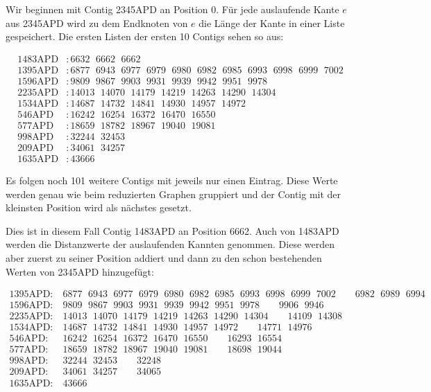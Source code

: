 Wir beginnen mit Contig 2345APD an Position 0. Für jede auslaufende Kante $e$ aus 2345APD wird zu dem Endknoten von $e$ die Länge der Kante in einer Liste gespeichert. Die ersten Listen der ersten 10 Contigs sehen so aus:
\begin{footnotesize}
\begin{align*}
\text{1483APD}&: 6632\ \ \,6662\ \ \,6662\\
\text{1395APD}&: 6877\ \ \,6943\ \ \,6977\ \ \,6979\ \ \,6980\ \ \,6982\ \ \,6985\ \ \,6993\ \ \,6998\ \ \,6999\ \ \,7002\\
\text{1596APD}&: 9809\ \ \,9867\ \ \,9903\ \ \,9931\ \ \,9939\ \ \,9942\ \ \,9951\ \ \,9978\\
\text{2235APD}&: 14013\ \ \,14070\ \ \,14179\ \ \,14219\ \ \,14263\ \ \,14290\ \ \,14304\\
\text{1534APD}&: 14687\ \ \,14732\ \ \,14841\ \ \,14930\ \ \,14957\ \ \,14972\\
\text{546APD}&: 16242\ \ \,16254\ \ \,16372\ \ \,16470\ \ \,16550\\
\text{577APD}&: 18659\ \ \,18782\ \ \,18967\ \ \,19040\ \ \,19081\\
\text{998APD}&: 32244\ \ \,32453\\
\text{209APD}&: 34061\ \ \,34257\\
\text{1635APD}&: 43666
\end{align*}
\end{footnotesize}
Es folgen noch 101 weitere Contigs mit jeweils nur einen Eintrag. Diese Werte werden genau wie beim reduzierten Graphen gruppiert und der Contig mit der kleinsten Position wird als nächstes gesetzt. 

Dies ist in diesem Fall Contig 1483APD an Position 6662. Auch von 1483APD werden die Distanzwerte der auslaufenden Kannten genommen. Diese werden aber zuerst zu seiner Position addiert und dann zu den schon bestehenden Werten von 2345APD hinzugefügt:

\begin{footnotesize}
\begin{align*}
\text{1395APD:}&\ 6877\ \ \,6943\ \ \,6977\ \ \,6979\ \ \,6980\ \ \,6982\ \ \,6985\ \ \,6993\ \ \,6998\ \ \,6999\ \ \,7002\quad\quad 6982\ \ \, 6989\ \ \,6994\\
\text{1596APD:}&\ 9809\ \ \,9867\ \ \,9903\ \ \,9931\ \ \,9939\ \ \,9942\ \ \,9951\ \ \,9978\quad\quad 9906\ \ \,9946\\
\text{2235APD:}&\ 14013\ \ \,14070\ \ \,14179\ \ \,14219\ \ \,14263\ \ \,14290\ \ \,14304\quad\quad 14109\ \ \,14308\\
\text{1534APD:}&\ 14687\ \ \,14732\ \ \,14841\ \ \,14930\ \ \,14957\ \ \,14972\quad\quad 14771\ \ \,14976\\
\text{546APD:}&\ 16242\ \ \,16254\ \ \,16372\ \ \,16470\ \ \,16550\quad\quad 16293\ \ \,16554\\
\text{577APD:}&\ 18659\ \ \,18782\ \ \,18967\ \ \,19040\ \ \,19081\quad\quad 18698\ \ \,19044\\
\text{998APD:}&\ 32244\ \ \,32453\quad\quad 32248\\
\text{209APD:}&\ 34061\ \ \,34257\quad\quad 34065\\
\text{1635APD:}&\ 43666
\end{align*}
\end{footnotesize}
